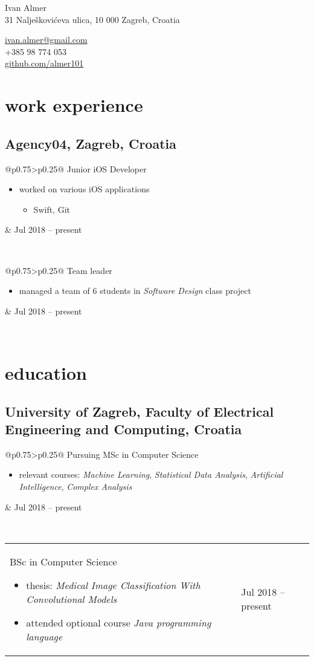 \documentclass[a4paper]{article}
\makeatletter
\newlength{\tablewidth}
\newenvironment{period}[2]{%
\newcommand{\sarma}{#2}%
\setlength{\tablewidth}{\linewidth}
\addtolength{\tablewidth}{-2\tabcolsep}
\begin{tabular}{@{}p{0.75\tablewidth}>{\raggedleft\arraybackslash}p{0.25\tablewidth}@{}}%
#1 \newline
\begin{itemize}
}{%
\end{itemize} & \sarma \\%
\end{tabular}\\
}
\makeatother
\begin{document}
\fontfamily{\sfdefault}
\selectfont

\begin{minipage}{.5\textwidth}
\LARGE{Ivan Almer}\\
\normalsize{31 Nalješkovićeva ulica, 10 000 Zagreb, Croatia}
\end{minipage}%
\begin{minipage}{.5\textwidth}
\raggedleft
\href{mailto:ivan.almer@gmail.com}{ivan.almer@gmail.com} \\
+385 98 774 053 \\
\href{https://github.com/almer101}{github.com/almer101}
\end{minipage}

\vspace{1em}

\section{work experience}
\subsection{Agency04, Zagreb, Croatia}
\begin{period}{Junior iOS Developer}{Jul 2018 -- present}
    \item 
        worked on various iOS applications
        \begin{itemize}
            \item Swift, Git
        \end{itemize}
\end{period}

\begin{period}{Team leader}{Sep 2018 -- Jan 2019}
    \item managed a team of 6 students in \textit{Software Design} class project
\end{period}

\section{education}
\subsection{University of Zagreb, Faculty of Electrical Engineering and Computing, Croatia}
\begin{period}{Pursuing MSc in Computer Science}{Sep 2019 -- May 2022\linebreak(expected)}
    \item relevant courses:
        \textit{Machine Learning},
        \textit{Statistical Data Analysis},
        \textit{Artificial Intelligence},
        \textit{Complex Analysis}
\end{period}
\begin{period}{BSc in Computer Science}{Sep 2016 -- Jul 2019}
    \item thesis:
        \textit{Medical Image Classification With Convolutional Models}
    \item attended optional course \textit{Java programming language}
\end{period}
\end{document}
